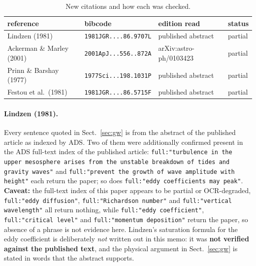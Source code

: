 \documentclass[english,a4paper]{my_memo}
\begin{document}
\begin{table}[htbp]\centering
\caption{New citations and how each was checked.}
\label{tab:verif}
\begin{tabular}{llll}
\toprule
reference & bibcode & edition read & status \\
\midrule
Lindzen (1981) & \texttt{1981JGR....86.9707L} & published abstract
  & partial \\
Ackerman \& Marley (2001) & \texttt{2001ApJ...556..872A} &
  arXiv:astro-ph/0103423 & partial \\
Prinn \& Barshay (1977) & \texttt{1977Sci...198.1031P} &
  published abstract & partial \\
Festou et al.\ (1981) & \texttt{1981JGR....86.5715F} &
  published abstract & partial \\
\bottomrule
\end{tabular}
\end{table}

\paragraph{Lindzen (1981).} Every sentence quoted in Sect.~\ref{sec:gw} is
from the abstract of the published article as indexed by ADS. Two of them
were additionally confirmed present in the ADS full-text index of the
published article: \texttt{full:"turbulence in the upper mesosphere arises
from the unstable breakdown of tides and gravity waves"} and
\texttt{full:"prevent the growth of wave amplitude with height"} each return
the paper; so does \texttt{full:"eddy coefficients may peak"}.
\textbf{Caveat:} the full-text index of this paper appears to be partial or
OCR-degraded, \texttt{full:"eddy diffusion"}, \texttt{full:"Richardson
number"} and \texttt{full:"vertical wavelength"} all return nothing, while
\texttt{full:"eddy coefficient"}, \texttt{full:"critical level"} and
\texttt{full:"momentum deposition"} return the paper, so absence of a
phrase is not evidence here. Lindzen's saturation formula for the eddy
coefficient is deliberately \emph{not} written out in this memo: it was
\textbf{not verified against the published text}, and the physical argument
in Sect.~\ref{sec:gw} is stated in words that the abstract supports.
\end{document}
